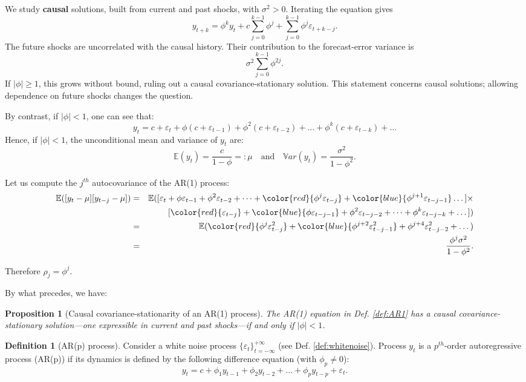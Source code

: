 \documentclass[
  11pt,
]{book}
\newtheorem{proposition}{Proposition}[chapter]
\theoremstyle{definition}
\newtheorem{definition}{Definition}[chapter]
\theoremstyle{definition}
\theoremstyle{definition}
\theoremstyle{definition}
\theoremstyle{remark}
\begin{document}
We study \textbf{causal} solutions, built from current and past shocks, with \(\sigma^2>0\). Iterating the equation gives
\[
y_{t+k}=\phi^k y_t+c\sum_{j=0}^{k-1}\phi^j+
\sum_{j=0}^{k-1}\phi^j\varepsilon_{t+k-j}.
\]
The future shocks are uncorrelated with the causal history. Their contribution to the forecast-error variance is
\[
\sigma^2\sum_{j=0}^{k-1}\phi^{2j}.
\]
If \(|\phi|\ge1\), this grows without bound, ruling out a causal covariance-stationary solution. This statement concerns causal solutions; allowing dependence on future shocks changes the question.

By contrast, if \(|\phi| < 1\), one can see that:
\[
y_t = c + \varepsilon_t + \phi  ( c + \varepsilon_{t-1})+ \phi^2  ( c + \varepsilon_{t-2})+ \dots + \phi^k  ( c + \varepsilon_{t-k}) + \dots
\]
Hence, if \(|\phi| < 1\), the unconditional mean and variance of \(y_t\) are:
\[
\mathbb{E}(y_t) = \frac{c}{1-\phi} =: \mu \quad \mbox{and} \quad \mathbb{V}ar(y_t) = \frac{\sigma^2}{1-\phi^2}.
\]

Let us compute the \(j^{th}\) autocovariance of the AR(1) process:
\begin{eqnarray*}
\mathbb{E}([y_{t} - \mu][y_{t-j} - \mu]) &=& \mathbb{E}([\varepsilon_t + \phi  \varepsilon_{t-1}+ \phi^2 \varepsilon_{t-2} + \dots + \color{red}{\phi^j \varepsilon_{t-j}} + \color{blue}{\phi^{j+1} \varepsilon_{t-j-1}} \dots]\times \\
&&[\color{red}{\varepsilon_{t-j}} + \color{blue}{\phi \varepsilon_{t-j-1}} + \phi^2 \varepsilon_{t-j-2} + \dots + \phi^k \varepsilon_{t-j-k} + \dots])\\
&=& \mathbb{E}(\color{red}{\phi^j \varepsilon_{t-j}^2}+\color{blue}{\phi^{j+2} \varepsilon_{t-j-1}^2}+\phi^{j+4} \varepsilon_{t-j-2}^2+\dots)\\
&=& \frac{\phi^j \sigma^2}{1 - \phi^2}.
\end{eqnarray*}

Therefore \(\rho_j = \phi^j\).

By what precedes, we have:

\begin{proposition}[Causal covariance-stationarity of an AR(1) process]
\protect\hypertarget{prp:statioAR1}{}\label{prp:statioAR1}The AR(1) equation in Def. \ref{def:AR1} has a causal covariance-stationary solution---one expressible in current and past shocks---if and only if \(|\phi|<1\).
\end{proposition}

\begin{definition}[AR(p) process]
\protect\hypertarget{def:ARp}{}\label{def:ARp}Consider a white noise process \(\{\varepsilon_t\}_{t = -\infty}^{+\infty}\) (see Def. \ref{def:whitenoise}). Process \(y_t\) is a \(p^{th}\)-order autoregressive process (AR(p)) if its dynamics is defined by the following difference equation (with \(\phi_p \ne 0\)):
\begin{equation}
y_t = c + \phi_1 y_{t-1} + \phi_2 y_{t-2} + \dots + \phi_p y_{t-p} + \varepsilon_t.\label{eq:AR}
\end{equation}
\end{definition}
\end{document}
